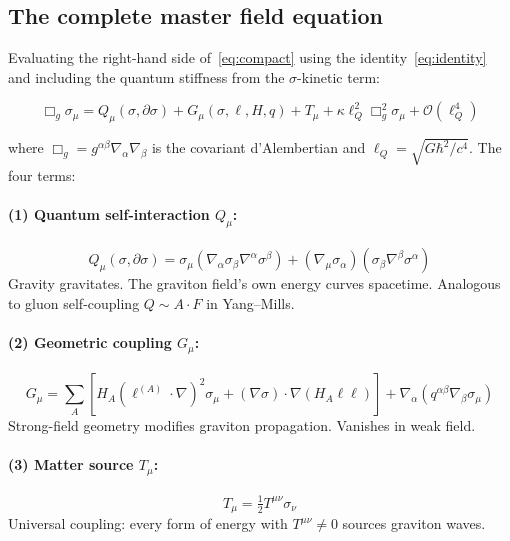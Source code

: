 \documentclass[11pt,a4paper]{article}
\theoremstyle{plain}
\theoremstyle{definition}
\theoremstyle{remark}
\newcommand{\lQ}{\ell_Q}
\begin{document}
\subsection{The complete master field equation}

Evaluating the right-hand side of~\eqref{eq:compact} using the identity~\eqref{eq:identity} and including the quantum stiffness from the $\sigma$-kinetic term:

\begin{equation}
  \boxed{\Box_g\sigma_\mu = Q_\mu(\sigma,\partial\sigma) + G_\mu(\sigma,\ell,H,q) + T_\mu + \kappa\lQ^2\Box_g^2\sigma_\mu + \mathcal{O}(\lQ^4)}
  \label{eq:master}
\end{equation}

where $\Box_g = g^{\alpha\beta}\nabla_\alpha\nabla_\beta$ is the covariant d'Alembertian and $\lQ = \sqrt{G\hbar^2/c^4}$.  The four terms:

\paragraph{(1) Quantum self-interaction $Q_\mu$:}
\begin{equation}
  Q_\mu(\sigma,\partial\sigma) = \sigma_\mu(\nabla_\alpha\sigma_\beta\nabla^\alpha\sigma^\beta) + (\nabla_\mu\sigma_\alpha)(\sigma_\beta\nabla^\beta\sigma^\alpha)
  \label{eq:Q}
\end{equation}
Gravity gravitates.  The graviton field's own energy curves spacetime.  Analogous to gluon self-coupling $Q \sim A \cdot F$ in Yang--Mills.

\paragraph{(2) Geometric coupling $G_\mu$:}
\begin{equation}
  G_\mu = \sum_A\!\left[H_A(\ell^{(A)}\!\cdot\!\nabla)^2\sigma_\mu + (\nabla\sigma)\cdot\nabla(H_A\ell\ell)\right] + \nabla_\alpha(q^{\alpha\beta}\nabla_\beta\sigma_\mu)
  \label{eq:G}
\end{equation}
Strong-field geometry modifies graviton propagation.  Vanishes in weak field.

\paragraph{(3) Matter source $T_\mu$:}
\begin{equation}
  T_\mu = \tfrac{1}{2}T^{\mu\nu}\sigma_\nu
  \label{eq:T}
\end{equation}
Universal coupling: every form of energy with $T^{\mu\nu} \neq 0$ sources graviton waves.
\end{document}
